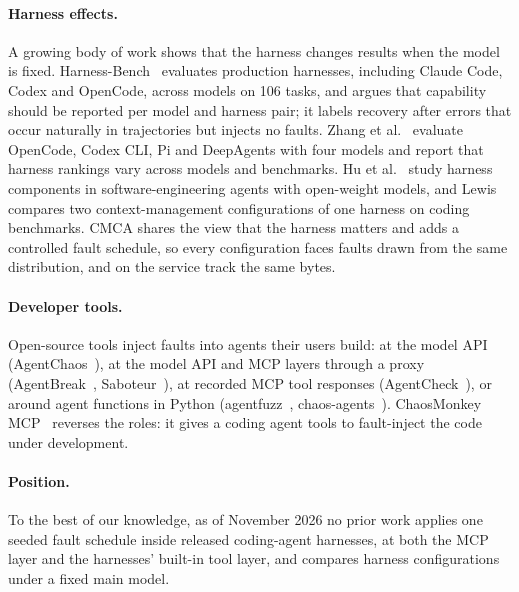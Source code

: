\paragraph{Harness effects.}
A growing body of work shows that the harness changes results when the model is fixed.
Harness-Bench~\citep{yao2026harnessbench} evaluates production harnesses, including Claude Code, Codex and OpenCode, across models on 106 tasks, and argues that capability should be reported per model and harness pair; it labels recovery after errors that occur naturally in trajectories but injects no faults.
Zhang et al.~\citep{zhang2026modelorharness} evaluate OpenCode, Codex CLI, Pi and DeepAgents with four models and report that harness rankings vary across models and benchmarks.
Hu et al.~\citep{hu2026beyondmodel} study harness components in software-engineering agents with open-weight models, and Lewis~\citep{lewis2026samemodel} compares two context-management configurations of one harness on coding benchmarks.
CMCA shares the view that the harness matters and adds a controlled fault schedule, so every configuration faces faults drawn from the same distribution, and on the service track the same bytes.

\paragraph{Developer tools.}
Open-source tools inject faults into agents their users build: at the model API (AgentChaos~\citep{agentchaos}), at the model API and MCP layers through a proxy (AgentBreak~\citep{agentbreak}, Saboteur~\citep{saboteur}), at recorded MCP tool responses (AgentCheck~\citep{mazumder2026agentcheck}), or around agent functions in Python (agentfuzz~\citep{agentfuzz}, chaos-agents~\citep{chaosagents}).
ChaosMonkey MCP~\citep{chaosmonkeymcp} reverses the roles: it gives a coding agent tools to fault-inject the code under development.

\paragraph{Position.}
To the best of our knowledge, as of November 2026 no prior work applies one seeded fault schedule inside released coding-agent harnesses, at both the MCP layer and the harnesses' built-in tool layer, and compares harness configurations under a fixed main model.
